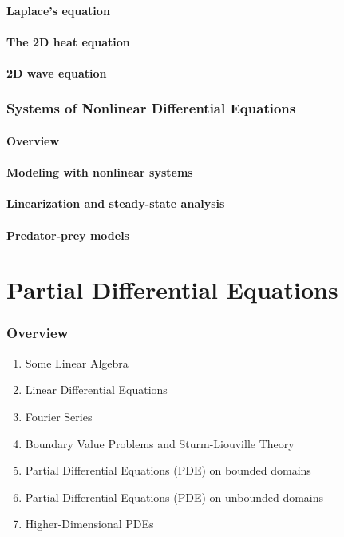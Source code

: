 \documentclass{article}
\begin{document}
\subsection{Laplace's equation}
\subsection{The 2D heat equation}
\subsection{2D wave equation}

\pagebreak

\section{Systems of Nonlinear Differential Equations}

\subsection*{Overview}

\subsection{Modeling with nonlinear systems}
\subsection{Linearization and steady-state analysis}
\subsection{Predator-prey models}

\part{Partial Differential Equations} %
\label{prt:Partial Differential Equations}

\section{Overview}%
\label{sec:Overview}

\begin{enumerate}
    \item Some Linear Algebra
    \item Linear Differential Equations
    \item Fourier Series
    \item Boundary Value Problems and Sturm-Liouville Theory
    \item Partial Differential Equations (PDE) on bounded domains
    \item Partial Differential Equations (PDE) on unbounded domains
    \item Higher-Dimensional PDEs
\end{enumerate}
\end{document}
